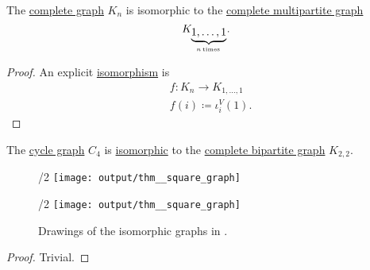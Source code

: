 \begin{proposition}\label{thm:small_complete_multipartite_graph}
  The \hyperref[def:complete_graph]{complete graph} \( K_n \) is isomorphic to the \hyperref[def:complete_multipartite_graph]{complete multipartite graph}
  \begin{equation*}
    K_{\underbrace{1,\ldots,1}_{n \T*{times}}}.
  \end{equation*}
\end{proposition}
\begin{proof}
  An explicit \hyperref[def:undirected_graph/homomorphism]{isomorphism} is
  \begin{equation*}
    \begin{aligned}
      &f: K_n \to K_{1,\ldots,1} \\
      &f(i) \coloneqq \iota^V_i(1).
    \end{aligned}
  \end{equation*}
\end{proof}

\begin{proposition}\label{thm:square_graph}
  The \hyperref[def:cycle_graph]{cycle graph} \( C_4 \) is \hyperref[def:undirected_graph/homomorphism]{isomorphic} to the \hyperref[def:complete_multipartite_graph]{complete bipartite graph} \( K_{2,2} \).

  \begin{figure}[!ht]
    \begin{subcaptionblock}{\textwidth/2}
      \centering
      \texttt{[image: output/thm\_\_square\_graph]}
      \caption{\( C_4 \)}\label{fig:thm:square_graph/c4}
    \end{subcaptionblock}
    \hfill
    \begin{subcaptionblock}{\textwidth/2}
      \centering
      \texttt{[image: output/thm\_\_square\_graph]}
      \caption{\( K_{2,2} \)}\label{fig:thm:square_graph/k22}
    \end{subcaptionblock}
    \caption{Drawings of the isomorphic graphs in .}\label{fig:thm:square_graph}
  \end{figure}
\end{proposition}
\begin{proof}
  Trivial.
\end{proof}

